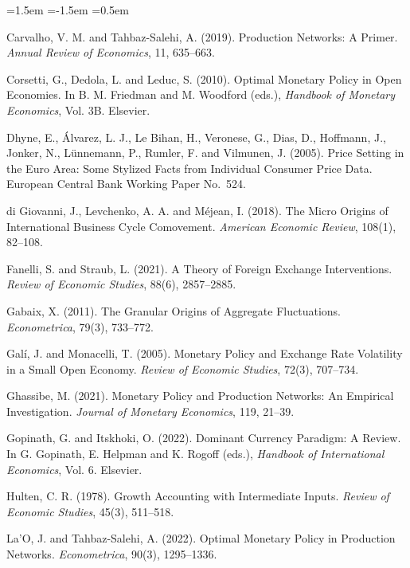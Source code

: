 \documentclass[12pt]{article}
\begin{document}
\begin{list}{}{\leftmargin=1.5em \itemindent=-1.5em \itemsep=0.5em}
\item Carvalho, V. M. and Tahbaz-Salehi, A. (2019). Production Networks: A Primer. \textit{Annual
Review of Economics}, 11, 635--663.

\item Corsetti, G., Dedola, L. and Leduc, S. (2010). Optimal Monetary Policy in Open Economies. In
B. M. Friedman and M. Woodford (eds.), \textit{Handbook of Monetary Economics}, Vol. 3B. Elsevier.

\item Dhyne, E., Álvarez, L. J., Le Bihan, H., Veronese, G., Dias, D., Hoffmann, J., Jonker, N., Lünnemann,
P., Rumler, F. and Vilmunen, J. (2005). Price Setting in the Euro Area: Some Stylized Facts from
Individual Consumer Price Data. European Central Bank Working Paper No.\ 524.

\item di Giovanni, J., Levchenko, A. A. and Méjean, I. (2018). The Micro Origins of International
Business Cycle Comovement. \textit{American Economic Review}, 108(1), 82--108.

\item Fanelli, S. and Straub, L. (2021). A Theory of Foreign Exchange Interventions. \textit{Review of
Economic Studies}, 88(6), 2857--2885.

\item Gabaix, X. (2011). The Granular Origins of Aggregate Fluctuations. \textit{Econometrica}, 79(3), 733--772.

\item Galí, J. and Monacelli, T. (2005). Monetary Policy and Exchange Rate Volatility in a Small Open
Economy. \textit{Review of Economic Studies}, 72(3), 707--734.

\item Ghassibe, M. (2021). Monetary Policy and Production Networks: An Empirical Investigation.
\textit{Journal of Monetary Economics}, 119, 21--39.

\item Gopinath, G. and Itskhoki, O. (2022). Dominant Currency Paradigm: A Review. In G. Gopinath, E.
Helpman and K. Rogoff (eds.), \textit{Handbook of International Economics}, Vol. 6. Elsevier.

\item Hulten, C. R. (1978). Growth Accounting with Intermediate Inputs. \textit{Review of Economic
Studies}, 45(3), 511--518.

\item La'O, J. and Tahbaz-Salehi, A. (2022). Optimal Monetary Policy in Production Networks.
\textit{Econometrica}, 90(3), 1295--1336.


\end{list}
\end{document}
